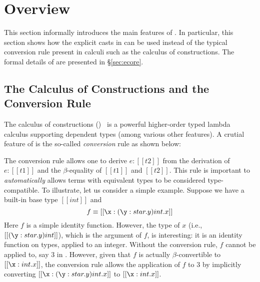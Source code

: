 \visiblecomments

\newlength{\blanklineskip}
\setlength{\blanklineskip}{0.66084ex}

\newcommand{\hsindent}[1]{\quad}%
\let\hspre\empty
\let\hspost\empty
\newcommand{\NB}{\textbf{NB}}
\newcommand{\Todo}[1]{$\langle$\textbf{To do:}~#1$\rangle$}

\EndFmtInput
\makeatother
%

\section{Overview}

This section informally introduces the main features of \name. In
particular, this section shows how the explicit casts in \name can be
used instead of the typical conversion rule present in calculi such as
the calculus of constructions. The formal details of \name are
presented in \S\ref{sec:ecore}.

\subsection{The Calculus of Constructions and the Conversion Rule}
\label{sec:coc}

The calculus of constructions (\coc)~\cite{coc} is a powerful
higher-order typed lambda calculus supporting dependent types (among
various other features).  A crutial
feature of \coc is the so-called \emph{conversion}
rule as shown below: \ottusedrule{\ottdruleTccXXConv{}}


The conversion rule allows one to derive $e:[[t2]]$ from the
derivation of $e:[[t1]]$ and the $\beta$-equality of $[[t1]]$ and
$[[t2]]$. This rule is important to \emph{automatically} allows 
terms with equivalent types to be considered type-compatible. 
To illustrate, let us consider a simple example. Suppose
we have a built-in base type $[[int]]$ and \[f \equiv [[\x:(\y:star.y)int.x]] \]
Here $f$ is a simple identity function. However, the type 
of $x$ (i.e., $[[(\y:star.y)int]]$), which is the argument of $f$, is interesting: it is 
an identity function on types, applied to an integer. 
Without the conversion rule, $f$ cannot be
applied to, say $3$ in \coc. However, given that $f$ is actually
$\beta$-convertible to $[[\x:int.x]]$, the conversion rule allows
the application of $f$ to $3$ by implicitly converting
$[[\x:(\y:star.y)int.x]]$ to $[[\x:int.x]]$.

